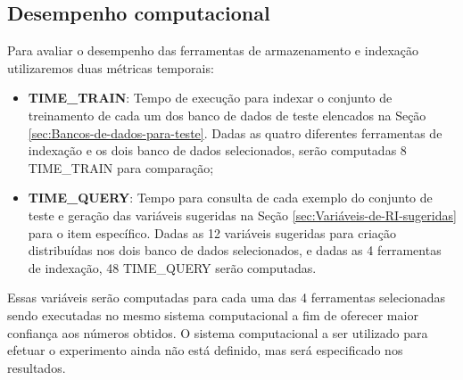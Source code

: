     \subsection{Desempenho computacional}  \label{sec:Desempenho-computacional}
        Para avaliar o desempenho das ferramentas de armazenamento e indexação utilizaremos duas métricas temporais:
        \begin{itemize}
            \item \textbf{TIME\_TRAIN}: Tempo de execução para indexar o conjunto de treinamento de cada um dos banco de dados de teste elencados na Seção \ref{sec:Bancos-de-dados-para-teste}. Dadas as quatro diferentes ferramentas de indexação e os dois banco de dados selecionados, serão computadas 8 TIME\_TRAIN para comparação;
            
            \item \textbf{TIME\_QUERY}: Tempo para consulta de cada exemplo do conjunto de teste e geração das variáveis sugeridas na Seção \ref{sec:Variáveis-de-RI-sugeridas} para o item específico. Dadas as 12 variáveis sugeridas para criação distribuídas nos dois banco de dados selecionados, e dadas as 4 ferramentas de indexação, 48 TIME\_QUERY serão computadas.  
        \end{itemize}
        
        Essas variáveis serão computadas para cada uma das 4 ferramentas selecionadas sendo executadas no mesmo sistema computacional a fim de oferecer maior confiança aos números obtidos. 
        O sistema computacional a ser utilizado para efetuar o experimento ainda não está definido, mas será especificado nos resultados.
    

